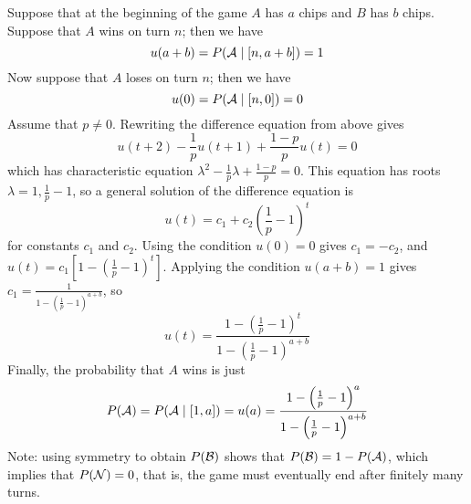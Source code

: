 \documentclass[newpage]{homework}
\begin{document}
\begin{alphaparts}
		\questionpart Suppose that at the beginning of the game $A$ has $a$ chips and $B$ has $b$ chips. Suppose that $A$ wins on turn $n$; then we have
		\begin{equation*}
			u(a + b) = P(\mathcal{A} \mid [n,a+b]) = 1
		\end{equation*}
		Now suppose that $A$ loses on turn $n$; then we have
		\begin{equation*}
			u(0) = P(\mathcal{A} \mid [n,0]) = 0
		\end{equation*}
		Assume that $p\ne 0$. Rewriting the difference equation from above gives
		\begin{equation*}
			u(t+2) - \frac{1}{p}u(t+1) + \frac{1-p}{p}u(t) = 0
		\end{equation*}
		which has characteristic equation $\lambda^2 - \frac{1}{p}\lambda + \frac{1-p}{p}= 0$. This equation has roots
		$\lambda = 1, \frac{1}{p} -1$, so a general solution of the difference equation is
		\begin{equation*}
			u(t) = c_1 + c_2\left(\frac{1}{p} - 1\right)^t
		\end{equation*}
		for constants $c_1$ and $c_2$. Using the condition $u(0) = 0$ gives $c_1  = -c_2$, and $u(t) = c_1\left[1-\left(\frac{1}{p}-1\right)^t\right]$. Applying the condition $u(a+b) = 1$ gives $c_1 = \frac{1}{1-\left(\frac{1}{p}-1\right)^{a+b}}$, so
		\begin{equation*}
			u(t) = \frac{1-\left(\frac{1}{p}-1\right)^t}{1-\left(\frac{1}{p} - 1\right)^{a+b}}
		\end{equation*}
		Finally, the probability that $A$ wins is just
		\begin{equation*}
			P(\mathcal{A}) = P(\mathcal{A} \mid [1, a]) = u(a) = \frac{1-\left(\frac{1}{p} - 1\right)^a}{1-\left(\frac{1}{p} - 1\right)^{a+b}}
		\end{equation*}
		Note: using symmetry to obtain $P(\mathcal{B})$ shows that $P(\mathcal{B}) = 1 - P(\mathcal{A})$, which implies that $P(\mathcal{N}) = 0$, that is, the game must eventually end after finitely many turns.
	
	\end{alphaparts}
	
\end{document}
